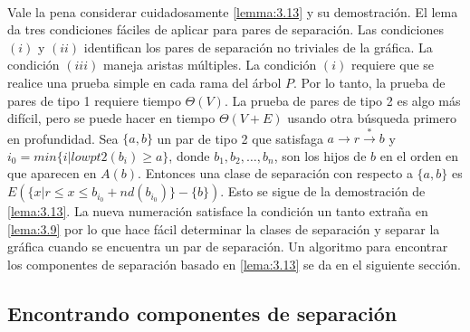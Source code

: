 \paragraph{}
Vale la pena considerar cuidadosamente \ref{lemma:3.13} y su demostración. El lema da tres condiciones fáciles de aplicar para pares de separación. Las condiciones $\left(i\right)$ y $\left(ii\right)$ identifican los pares de separación no triviales de la gráfica. La condición $\left(iii\right)$ maneja aristas múltiples. La condición $\left(i\right)$ requiere que se realice una prueba simple en cada rama del árbol $P$. Por lo tanto, la prueba de pares de tipo 1 requiere tiempo $\Theta\left(V\right)$. La prueba de pares de tipo 2 es algo más difícil, pero se puede hacer en tiempo $\Theta\left(V + E\right)$ usando otra búsqueda primero en profundidad. Sea $\{a, b\}$ un par de tipo 2 que satisfaga $a \rightarrow r \overset{\ast}{\rightarrow} b$ y $i_{0} = min\{i | lowpt2\left(b_{i}\right) \geq a\}$, donde $b_{1}, b_{2}, \ldots, b_{n}$, son los hijos de $b$ en el orden en que aparecen en $A\left(b\right)$. Entonces una clase de separación con respecto a $\{a,b\}$ es $E\left(\{x | r \leq x \le b_{i_{0}} + nd\left(b_{i_{0}}\right)\} - \{b\}\right)$. Esto se sigue de la demostración de \ref{lema:3.13}. La nueva numeración satisface la condición un tanto extraña en \ref{lema:3.9} por lo que hace fácil determinar la clases de separación y separar la gráfica cuando se encuentra un par de separación. Un algoritmo para encontrar los componentes de separación basado en \ref{lema:3.13} se da en el siguiente sección.

\subsection{Encontrando componentes de separación}

